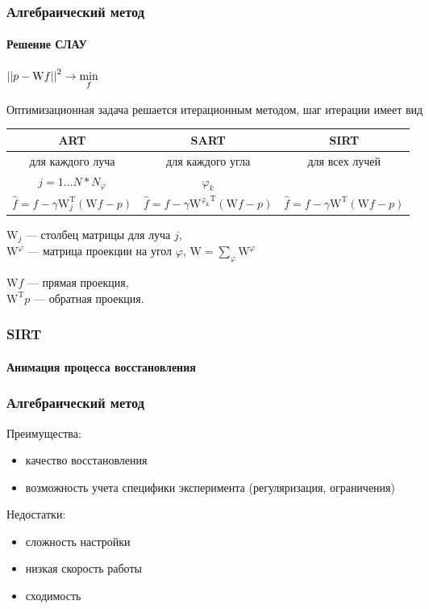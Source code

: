 \begin{frame}
\frametitle{Алгебраический метод}
\framesubtitle{Решение СЛАУ}
\centering
$\left|\left| p - \mathrm W f \right|\right|^2 \rightarrow \min\limits_f$

Оптимизационная задача решается итерационным методом, шаг итерации имеет вид
\vspace{0.5cm}

\begingroup
\footnotesize

\hspace*{-0.5cm}
\begin{tabular}{c|c|c}
ART & SART & SIRT \\ \hline
для каждого луча & для каждого угла & для всех лучей\\
$j = 1 \dots N * N_\varphi$ & $\varphi_k$ & \\
$\hat{f} = f - \gamma \mathrm W^{\mathrm T}_j(\mathrm W f - p)$ &
$\hat{f} = f - \gamma \mathrm {W^{\varphi_k}}^{\mathrm T}(\mathrm W f - p)$ &
$\hat{f} = f - \gamma \mathrm W^{\mathrm T}(\mathrm W f - p)$ \\
\end{tabular}

\vspace{0.2cm}
\raggedright
\endgroup

$\mathrm W_j$ --- столбец матрицы для луча $j$,\\
$\mathrm W^\varphi$ ---  матрица проекции на угол $\varphi$, $\mathrm W = \sum_\varphi {\mathrm W^\varphi}$
\\
\vspace{0.4cm}

$\mathrm W f$ --- прямая проекция, \\
$\mathrm W^{\mathrm T} p$ --- обратная проекция.
\end{frame}


\begin{frame}
\frametitle{SIRT}
\framesubtitle{Анимация процесса восстановления}
\end{frame}

\begin{frame}
\frametitle{Алгебраический метод}

Преимущества:\\
\begin{itemize}
  \item качество восстановления
  \item возможность учета специфики эксперимента (регуляризация, ограничения)
\end{itemize}
\vspace{1.5cm}

Недостатки:\\
\begin{itemize}
  \item сложность настройки
  \item низкая скорость работы
  \item сходимость
\end{itemize}
\end{frame}

